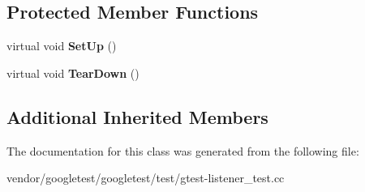\subsection*{Protected Member Functions}
\begin{DoxyCompactItemize}
\item 
\mbox{\label{classtesting_1_1internal_1_1_environment_invocation_catcher_a325365b0ecfa71a4a767d7a1817c9663}} 
virtual void {\bfseries Set\+Up} ()
\item 
\mbox{\label{classtesting_1_1internal_1_1_environment_invocation_catcher_afc89ee0a8e32e6746a89fcc1682f62e9}} 
virtual void {\bfseries Tear\+Down} ()
\end{DoxyCompactItemize}
\subsection*{Additional Inherited Members}


The documentation for this class was generated from the following file\+:\begin{DoxyCompactItemize}
\item 
vendor/googletest/googletest/test/gtest-\/listener\+\_\+test.\+cc\end{DoxyCompactItemize}
